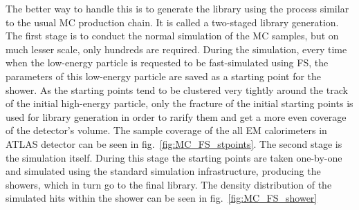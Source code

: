 The better way to handle this is to generate the library using the process similar to the usual MC production chain. It is called a two-staged library generation. The first stage is to conduct the normal simulation of the MC samples, but on much lesser scale, only hundreds are required. During the simulation, every time when the low-energy particle is requested to be fast-simulated using FS, the parameters of this low-energy particle are saved as a starting point for the shower. As the starting points tend to be clustered very tightly around the track of the initial high-energy particle, only the fracture of the initial starting points is used for library generation in order to rarify them and get a more even coverage of the detector's volume. The sample coverage of the all EM calorimeters in ATLAS detector can be seen in fig.~\ref{fig:MC_FS_stpoints}. The second stage is the simulation itself. During this stage the starting points are taken one-by-one and simulated using the standard simulation infrastructure, producing the showers, which in turn go to the final library. The density distribution of the simulated hits within the shower can be seen in fig.~\ref{fig:MC_FS_shower}

\begin{figure}
\end{figure}

